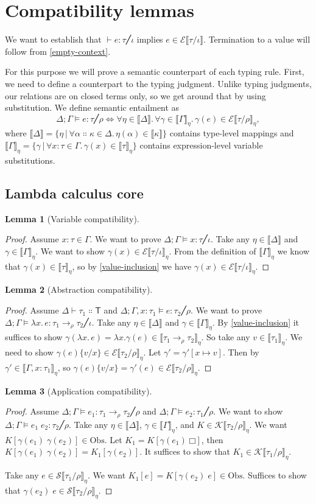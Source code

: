 \documentclass[a4paper, 12pt]{report}
\newcommand{\subst}[2]{\{#1/#2\}}
\newcommand{\E}{\mathcal{E}}
\newcommand{\K}{\mathcal{K}}
\renewcommand{\S}{\mathcal{S}}
\newcommand{\kT}{\mathsf{T}}
\newcommand{\Obs}{\mathrm{Obs}}
\newcommand{\+}{\enspace}
\newtheorem{lemma}{Lemma}
\begin{document}
\section{Compatibility lemmas}
We want to establish that $⊢ e : τ ╱ ι$ implies $e ∈ \E⟦τ/ι⟧$.
Termination to a value will follow from \cref{empty-context}.

For this purpose we will prove a semantic counterpart of each typing rule.
First, we need to define a counterpart to the typing judgment.
Unlike typing judgments, our relations are on closed terms only,
so we get around that by using substitution.
We define semantic entailment as
$$Δ;Γ ⊨ e : τ ╱ ρ ⇔ ∀η∈⟦Δ⟧.\, ∀γ∈⟦Γ⟧_η.\,γ(e) ∈ \E⟦τ/ρ⟧_η,$$
where $⟦Δ⟧ = \{ η │ ∀α∷κ∈Δ.\,η(α) ∈ ⟦κ⟧ \}$ contains type-level mappings
and $⟦Γ⟧_η = \{ γ │ ∀x:τ∈Γ.\,γ(x) ∈ ⟦τ⟧_η\}$ contains expression-level
variable substitutions.

\subsection{Lambda calculus core}

\begin{lemma}[Variable compatibility]
\end{lemma}
\begin{proof}
Assume $x : τ ∈ Γ$.
We want to prove $Δ;Γ ⊨ x : τ ╱ ι$.
Take any $η∈⟦Δ⟧$ and $γ∈⟦Γ⟧_η$.
We want to show $γ(x) ∈ \E⟦τ/ι⟧_η$.
From the definition of $⟦Γ⟧_η$
we know that $γ(x) ∈ ⟦τ⟧_η$,
so by \cref{value-inclusion} we have $γ(x) ∈ \E⟦τ/ι⟧_η$.
\end{proof}

\begin{lemma}[Abstraction compatibility]
\end{lemma}
\begin{proof}
Assume $Δ ⊢ τ_1 ∷ \kT$ and $Δ;Γ,x:τ_1 ⊨ e : τ_2 ╱ ρ$.
We want to prove $Δ;Γ ⊨ λx.\,e : τ_1 →_ρ τ_2 ╱ ι$.
Take any $η∈⟦Δ⟧$ and $γ∈⟦Γ⟧_η$.
By \cref{value-inclusion} it suffices to show
$γ(λx.\,e) = λx. γ(e) ∈ ⟦τ_1 →_ρ τ_2⟧_η$.
So take any $v ∈ ⟦τ_1⟧_η.$
We need to show $γ(e)\subst{v}{x} ∈ \E⟦τ_2/ρ⟧_η$.
Let $γ' = γ'[x↦v]$.
Then by $γ' ∈ ⟦Γ,x:τ_1⟧_η$, so $γ(e)\subst{v}{x} = γ'(e) ∈ \E⟦τ_2/ρ⟧_η.$
\end{proof}

\begin{lemma}[Application compatibility]
\end{lemma}
\begin{proof}
Assume $Δ;Γ ⊨ e_1 : τ_1 →_ρ τ_2 ╱ ρ$ and $Δ;Γ ⊨ e_2 : τ_1 ╱ ρ$.
We want to show $Δ;Γ ⊨ e_1\;e_2 : τ_2 ╱ ρ$.
Take any $η∈⟦Δ⟧$, $γ∈⟦Γ⟧_η$, and $K ∈ \K⟦τ_2/ρ⟧_η$.
We want $K[γ(e_1)\;γ(e_2)] ∈ \Obs$.
Let $K_1 = K[γ(e_1)\;□]$, then $K[γ(e_1)\;γ(e_2)] = K_1[γ(e_2)]$.
It suffices to show that $K_1 ∈ \K⟦τ_1/ρ⟧_η$.

Take any $e ∈ \S⟦τ_1/ρ⟧_η$.
We want $K_1[e] = K[γ(e_2)\;e] ∈ \Obs$.
Suffices to show that $γ(e_2)\;e ∈ \S⟦τ_2/ρ⟧_η$.
\end{proof}
\end{document}
